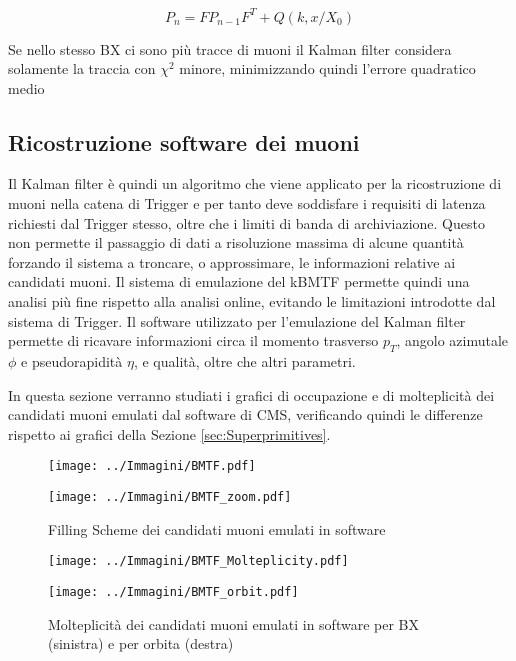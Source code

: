 \begin{equation}
  \label{eq:covariance}
  P_n = FP_{n-1}F^T + Q(k, x/X_0)
\end{equation}

Se nello stesso BX ci sono più tracce di muoni il Kalman filter considera solamente la traccia con $\chi^2$ minore, minimizzando quindi l'errore quadratico medio \cite{Summers:2728522}

\subsection{Ricostruzione software dei muoni}
\label{sec:KalmanFilterSoftware}

Il Kalman filter è quindi un algoritmo che viene applicato per la ricostruzione di muoni nella catena di Trigger e per tanto deve soddisfare i requisiti di latenza richiesti dal Trigger stesso, oltre che i limiti di banda di archiviazione. Questo non permette il passaggio di dati a risoluzione massima di alcune quantità forzando il sistema a troncare, o approssimare, le informazioni relative ai candidati muoni. Il sistema di emulazione del kBMTF permette quindi una analisi più fine rispetto alla analisi online, evitando le limitazioni introdotte dal sistema di Trigger. Il software utilizzato per l'emulazione del Kalman filter permette di ricavare informazioni circa il momento trasverso $p_T$, angolo azimutale $\phi$ e pseudorapidità $\eta$, e qualità, oltre che altri parametri.

In questa sezione verranno studiati i grafici di occupazione e di molteplicità dei candidati muoni emulati dal software di CMS, verificando quindi le differenze rispetto ai grafici della Sezione \ref{sec:Superprimitives}.



\begin{figure}[t]
  \centering
  \begin{minipage}[b]{0.49\textwidth}
      \centering
      \texttt{[image: ../Immagini/BMTF.pdf]} 
    \end{minipage}
    \hfill 
    \begin{minipage}[b]{0.49\textwidth}
      \centering
      \texttt{[image: ../Immagini/BMTF\_zoom.pdf]} 
    \end{minipage}
    \caption{Filling Scheme dei candidati muoni emulati in software }
  \label{fig:BMTFMuons}
\end{figure}

\begin{figure}[t]
  \centering
  \begin{minipage}[b]{0.49\textwidth}
      \centering
      \texttt{[image: ../Immagini/BMTF\_Molteplicity.pdf]} 
    \end{minipage}
    \hfill 
    \begin{minipage}[b]{0.49\textwidth}
      \centering
      \texttt{[image: ../Immagini/BMTF\_orbit.pdf]} 
    \end{minipage}
    \caption{Molteplicità dei candidati muoni emulati in software per BX (sinistra) e per orbita (destra)}
  \label{fig:BMTFMolteplicity}
\end{figure}

